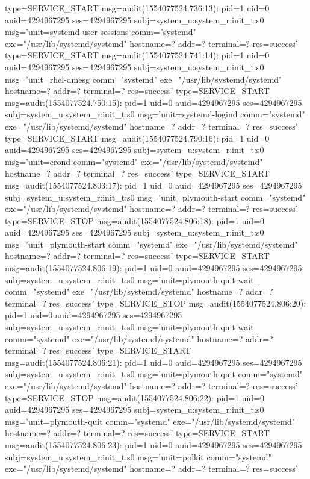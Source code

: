 \documentclass[]{report}
\newenvironment{Shaded}{}{}
\newcommand{\NormalTok}[1]{#1}
\begin{document}
\begin{Shaded}
\begin{Highlighting}[]
\NormalTok{type=SERVICE_START msg=audit(1554077524.736:13): pid=1 uid=0 auid=4294967295 ses=4294967295 subj=system_u:system_r:init_t:s0 msg='unit=systemd-user-sessions comm="systemd" exe="/usr/lib/systemd/systemd" hostname=? addr=? terminal=? res=success'}
\NormalTok{type=SERVICE_START msg=audit(1554077524.741:14): pid=1 uid=0 auid=4294967295 ses=4294967295 subj=system_u:system_r:init_t:s0 msg='unit=rhel-dmesg comm="systemd" exe="/usr/lib/systemd/systemd" hostname=? addr=? terminal=? res=success'}
\NormalTok{type=SERVICE_START msg=audit(1554077524.750:15): pid=1 uid=0 auid=4294967295 ses=4294967295 subj=system_u:system_r:init_t:s0 msg='unit=systemd-logind comm="systemd" exe="/usr/lib/systemd/systemd" hostname=? addr=? terminal=? res=success'}
\NormalTok{type=SERVICE_START msg=audit(1554077524.790:16): pid=1 uid=0 auid=4294967295 ses=4294967295 subj=system_u:system_r:init_t:s0 msg='unit=crond comm="systemd" exe="/usr/lib/systemd/systemd" hostname=? addr=? terminal=? res=success'}
\NormalTok{type=SERVICE_START msg=audit(1554077524.803:17): pid=1 uid=0 auid=4294967295 ses=4294967295 subj=system_u:system_r:init_t:s0 msg='unit=plymouth-start comm="systemd" exe="/usr/lib/systemd/systemd" hostname=? addr=? terminal=? res=success'}
\NormalTok{type=SERVICE_STOP msg=audit(1554077524.806:18): pid=1 uid=0 auid=4294967295 ses=4294967295 subj=system_u:system_r:init_t:s0 msg='unit=plymouth-start comm="systemd" exe="/usr/lib/systemd/systemd" hostname=? addr=? terminal=? res=success'}
\NormalTok{type=SERVICE_START msg=audit(1554077524.806:19): pid=1 uid=0 auid=4294967295 ses=4294967295 subj=system_u:system_r:init_t:s0 msg='unit=plymouth-quit-wait comm="systemd" exe="/usr/lib/systemd/systemd" hostname=? addr=? terminal=? res=success'}
\NormalTok{type=SERVICE_STOP msg=audit(1554077524.806:20): pid=1 uid=0 auid=4294967295 ses=4294967295 subj=system_u:system_r:init_t:s0 msg='unit=plymouth-quit-wait comm="systemd" exe="/usr/lib/systemd/systemd" hostname=? addr=? terminal=? res=success'}
\NormalTok{type=SERVICE_START msg=audit(1554077524.806:21): pid=1 uid=0 auid=4294967295 ses=4294967295 subj=system_u:system_r:init_t:s0 msg='unit=plymouth-quit comm="systemd" exe="/usr/lib/systemd/systemd" hostname=? addr=? terminal=? res=success'}
\NormalTok{type=SERVICE_STOP msg=audit(1554077524.806:22): pid=1 uid=0 auid=4294967295 ses=4294967295 subj=system_u:system_r:init_t:s0 msg='unit=plymouth-quit comm="systemd" exe="/usr/lib/systemd/systemd" hostname=? addr=? terminal=? res=success'}
\NormalTok{type=SERVICE_START msg=audit(1554077524.806:23): pid=1 uid=0 auid=4294967295 ses=4294967295 subj=system_u:system_r:init_t:s0 msg='unit=polkit comm="systemd" exe="/usr/lib/systemd/systemd" hostname=? addr=? terminal=? res=success'}

\end{Highlighting}
\end{Shaded}
\end{document}
